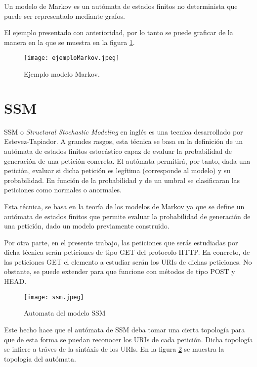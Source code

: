 Un modelo de Markov es un autómata de estados finitos no determinista que puede ser representado mediante grafos.

El ejemplo presentado con anterioridad, por lo tanto se puede graficar de la manera en la que se muestra en la figura \ref{fig:modeloMarkov}.

\begin{figure}[H]
\begin{center}
\texttt{[image: ejemploMarkov.jpeg]}
\caption{Ejemplo modelo Markov.}
\label{fig:modeloMarkov}
\end{center}
\end{figure}


\section{SSM}\label{sec:modeloSSM}

SSM o \textit{Structural Stochastic Modeling} en ingl\'es es una tecnica desarrollado por Estevez-Tapiador. A grandes rasgos, esta t\'ecnica se basa en la definición de un autómata de estados finitos estocástico capaz de evaluar la probabilidad de generación de una petición concreta. El autómata permitirá, por tanto, dada una petición, evaluar si dicha petición es legítima (corresponde al modelo) y su probabilidad. En función de la probabilidad y de un umbral se clasificaran las peticiones como normales o anormales.\cite{ssm}

Esta t\'ecnica, se basa en la teor\'ia de los modelos de Markov ya que se define un autómata de estados finitos que permite evaluar la probabilidad de generaci\'on de una petici\'on, dado un modelo previamente construido.

Por otra parte, en el presente trabajo, las peticiones que ser\'as estudiadas por dicha t\'ecnica ser\'an peticiones de tipo GET del protocolo HTTP. En concreto, de las peticiones GET el elemento a estudiar ser\'an los URIs de dichas peticiones. No obstante, se puede extender para que funcione con m\'etodos de tipo POST y HEAD. 

\begin{figure}
\begin{center}
  \texttt{[image: ssm.jpeg]}
  \caption{Automata del modelo SSM}
  \label{fig:ssm}
\end{center}

\end{figure}

Este hecho hace que el autómata de SSM deba tomar una cierta topolog\'ia para que de esta forma se puedan reconocer los URIs de cada petici\'on. Dicha topolog\'ia se infiere a tráves de la sint\'axis de los URIs. En la figura \ref{fig:ssm} se muestra la topolog\'ia del autómata.


